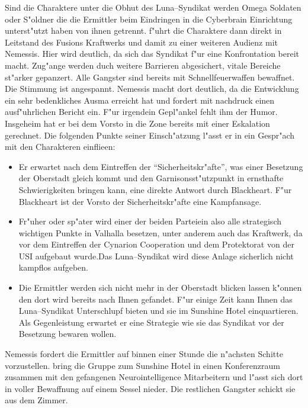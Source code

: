 Sind die Charaktere unter die Obhut des Luna--Syndikat werden Omega Soldaten oder S"oldner die die Ermittler beim Eindringen in die Cyberbrain Einrichtung unterst"utzt haben von ihnen getrennt. \xl{} f"uhrt die Charaktere dann direkt in Leitstand des Fusions Kraftwerks und damit zu einer weiteren Audienz mit Nemessis. Hier wird deutlich, da\3 sich das Syndikat f"ur eine Konfrontation bereit macht. Zug"ange werden duch weitere Barrieren abgesichert, vitale Bereiche st"arker gepanzert. Alle Gangster sind bereits mit Schnellfeuerwaffen bewaffnet. Die Stimmung ist angespannt. Nemessis macht dort deutlich, da\3 die Entwicklung ein sehr bedenkliches Ausma\3 erreicht hat und fordert mit nachdruck einen ausf"uhrlichen Bericht ein. F"ur irgendein Gepl"ankel fehlt ihm der Humor. Insgeheim hat er bei dem Vorsto\3 in die Zone bereits mit einer Eskalation gerechnet. Die folgenden Punkte seiner Einsch"atzung l"asst er in ein Gespr"ach mit den Charakteren einflie\3en:

\begin{itemize}
	\item Er erwartet nach dem Eintreffen der "`Sicherheitskr"afte"', was einer Besetzung der Oberstadt gleich kommt und den 			
		Garnisonsst"utzpunkt in ernsthafte Schwierigkeiten bringen kann, eine direkte Antwort durch Blackheart. F"ur Blackheart ist der Vorsto\3 der Sicherheitskr"afte eine Kampfansage.
	\item Fr"uher oder sp"ater wird einer der beiden Parteiein also alle strategisch wichtigen Punkte in Valhalla besetzen, unter anderem 	
		auch das Kraftwerk, da\3 vor dem Eintreffen der Cynarion Cooperation und dem Protektorat von der USI aufgebaut wurde.Das Luna--Syndikat wird diese Anlage sicherlich nicht kampflos aufgeben.
	\item Die Ermittler werden sich nicht mehr in der Oberstadt blicken lassen k"onnen den dort wird bereits nach Ihnen gefandet. F"ur 
		einige Zeit kann Ihnen das Luna--Syndikat Unterschlupf bieten und sie im Sunshine Hotel einquartieren. Als Gegenleistung erwartet er eine Strategie wie sie das Syndikat vor der Besetzung bewaren wollen.
\end{itemize}

Nemessis fordert die Ermittler auf binnen einer Stunde die n"achsten Schitte vorzustellen. \xl{} bring die Gruppe zum Sunshine Hotel in einen Konferenzraum zusammen mit den gefangenen Neurointelligence Mitarbeitern und l"asst sich dort in voller Bewaffnung auf einem Sessel nieder. Die restlichen Gangster schickt sie aus dem Zimmer.

